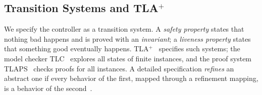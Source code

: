 \subsection{Transition Systems and TLA$^+$}\label{sec:bg-tla}
We specify the controller as a transition system. A \emph{safety property} states that nothing bad happens and is proved with an \emph{invariant}; a \emph{liveness property} states that something good eventually happens. TLA$^+$~\cite{lamport1994tla,lamport2002specifying} specifies such systems; the model checker TLC~\cite{yu1999tlc} explores all states of finite instances, and the proof system TLAPS~\cite{cousineau2012tlaps} checks proofs for all instances. A detailed specification \emph{refines} an abstract one if every behavior of the first, mapped through a refinement mapping, is a behavior of the second~\cite{abadi1991refinement,lynch1995simulations}.

